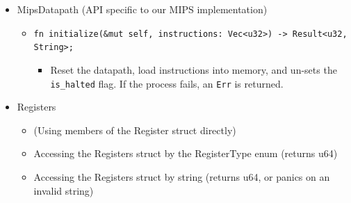 \documentclass[
    paper=letter,
    parskip=half,
    fontsize=12pt,
    titlepage=firstiscover,
    toc=bibliography,
    numbers=endperiod
]{scrartcl}
\providecommand{\tightlist}{%
  \setlength{\itemsep}{0pt}\setlength{\parskip}{0pt}}
\begin{document}
\begin{itemize}
    \item MipsDatapath (API specific to our MIPS implementation)
          \begin{itemize}
              \tightlist
              \item \texttt{fn initialize(\&mut self, instructions: Vec\textless u32\textgreater) -\textgreater{} Result\textless u32, String\textgreater;}
                    \begin{itemize}
                        \tightlist
                        \item Reset the datapath, load instructions into memory, and un-sets the
                              \texttt{is\_halted} flag. If the process fails, an \texttt{Err} is
                              returned.
                    \end{itemize}
          \end{itemize}

    \item Registers
          \begin{itemize}
              \tightlist
              \item (Using members of the Register struct directly)
              \item Accessing the Registers struct by the RegisterType enum (returns u64)
              \item Accessing the Registers struct by string (returns u64, or panics on an
                    invalid string)
          \end{itemize}


\end{itemize}
\end{document}

